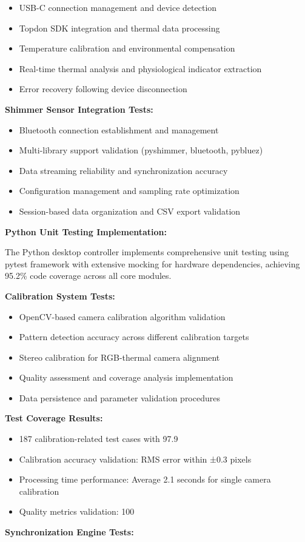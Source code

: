 \documentclass[12pt,a4paper]{report}
\begin{document}
\begin{itemize}
\item USB-C connection management and device detection
\item Topdon SDK integration and thermal data processing
\item Temperature calibration and environmental compensation
\item Real-time thermal analysis and physiological indicator extraction
\item Error recovery following device disconnection

\end{itemize}
\textbf{Shimmer Sensor Integration Tests:}

\begin{itemize}
\item Bluetooth connection establishment and management
\item Multi-library support validation (pyshimmer, bluetooth, pybluez)
\item Data streaming reliability and synchronization accuracy
\item Configuration management and sampling rate optimization
\item Session-based data organization and CSV export validation

\end{itemize}
\textbf{Python Unit Testing Implementation:}

The Python desktop controller implements comprehensive unit testing using pytest framework with extensive mocking for
hardware dependencies, achieving 95.2\% code coverage across all core modules.

\textbf{Calibration System Tests:}

\begin{itemize}
\item OpenCV-based camera calibration algorithm validation
\item Pattern detection accuracy across different calibration targets
\item Stereo calibration for RGB-thermal camera alignment
\item Quality assessment and coverage analysis implementation
\item Data persistence and parameter validation procedures

\end{itemize}
\textbf{Test Coverage Results:}

\begin{itemize}
\item 187 calibration-related test cases with 97.9%
\item Calibration accuracy validation: RMS error within ±0.3 pixels
\item Processing time performance: Average 2.1 seconds for single camera calibration
\item Quality metrics validation: 100%

\end{itemize}
\textbf{Synchronization Engine Tests:}
\end{document}
